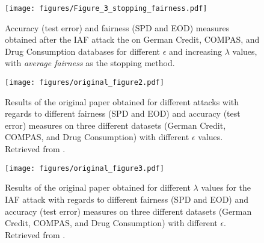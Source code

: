 \begin{figure}
    \centering
    \texttt{[image: figures/Figure\_3\_stopping\_fairness.pdf]}
    \caption{Accuracy (test error) and fairness (SPD and EOD) measures obtained after the IAF attack the on German Credit, COMPAS, and Drug Consumption databases for different $\epsilon$ and increasing $\lambda$ values, with \textit{average fairness} as the stopping method.}
    \label{fig:3-stop-fairness}
\end{figure}

\begin{figure}
    \centering
    \texttt{[image: figures/original\_figure2.pdf]}
    \caption{Results of the original paper obtained for different attacks with regards to different fairness (SPD and EOD) and accuracy (test error) measures on three different datasets (German Credit, COMPAS, and Drug Consumption) with different $\epsilon$ values. Retrieved from \citep{originalpaper}.}
    \label{fig:orig-fig2}
\end{figure}

\begin{figure}
    \centering
    \texttt{[image: figures/original\_figure3.pdf]}
    \caption{Results of the original paper obtained for different $\lambda$ values for the IAF attack with regards to different fairness (SPD and EOD) and accuracy (test error) measures on three different datasets (German Credit, COMPAS, and Drug Consumption) with different $\epsilon$. Retrieved from \citep{originalpaper}.}
    \label{fig:orig-fig3}
\end{figure}


